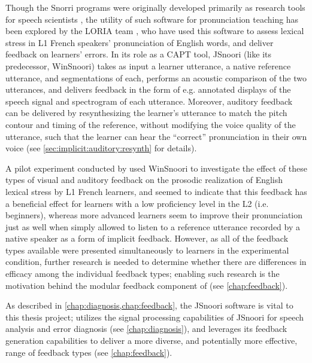 	Though the Snorri programs were originally developed primarily as research tools for speech scientists %
	\citep{Fohr1989,Laprie1999}, 
	the utility of such software
	for pronunciation teaching has been explored by the LORIA team \citep{Bonneau2004,Henry2007,Bonneau2011},
	who have used 
	this software to assess lexical stress in L1 French speakers' pronunciation of English words, and deliver feedback on learners' errors. 
In its role as a CAPT tool, JSnoori (like its predecessor, WinSnoori)
takes as input a learner utterance, a native reference utterance, and segmentations of each, performs an acoustic comparison of the two utterances, and delivers feedback 
in the form of e.g. annotated displays of the speech signal and spectrogram of each utterance. Moreover, auditory feedback can be delivered 
by
resynthesizing the learner's utterance to match the pitch contour and timing of the reference, without modifying the voice quality of the utterance, such that the learner can hear the ``correct'' pronunciation in their own voice (see \cref{sec:implicit:auditory:resynth} for details). 

	A pilot experiment conducted by \textcite{Bonneau2011} used WinSnoori to investigate the effect of these types of visual and auditory feedback on the prosodic realization of English lexical stress by L1 French learners, and seemed to indicate that this feedback has a beneficial effect for learners with a low proficiency level in the L2 (i.e. beginners), whereas more advanced learners seem to improve their pronunciation just as well when simply allowed to listen to a reference utterance recorded by a native speaker as a form of implicit feedback. However, as all of the feedback types available were presented simultaneously to learners in the experimental condition, further research is needed to determine whether there are differences in efficacy among the individual feedback types; enabling such research is the motivation behind the modular feedback component of  (see \cref{chap:feedback}).

	

As described in \cref{chap:diagnosis,chap:feedback}, 
the JSnoori software is vital to this thesis project;
utilizes the signal processing capabilities of JSnoori 
for speech analysis and error diagnosis (see \cref{chap:diagnosis}), 
and leverages its feedback generation capabilities to deliver  a more diverse, and potentially more effective, range of feedback types (see \cref{chap:feedback}). 
	
